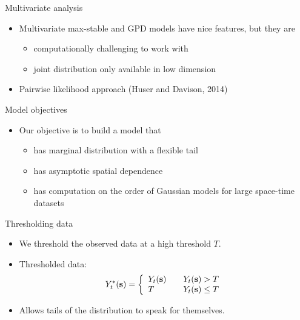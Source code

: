 \documentclass{beamer}
\begin{document}
\begin{frame}{Multivariate analysis}
  \begin{itemize} \setlength{\itemsep}{0.5em}
    \item Multivariate max-stable and GPD models have nice features, but they are
    \begin{itemize}
      \item computationally challenging to work with
      \item joint distribution only available in low dimension
    \end{itemize}
    \item Pairwise likelihood approach (Huser and Davison, 2014)
  \end{itemize}
\end{frame}

\begin{frame}{Model objectives}
  \begin{itemize} \setlength{\itemsep}{0.5em}
    \item Our objective is to build a model that
    \begin{itemize}
      \item has marginal distribution with a flexible tail
      \item has asymptotic spatial dependence
      \item has computation on the order of Gaussian models for large space-time datasets
    \end{itemize}
  \end{itemize}
\end{frame}

\begin{frame}{Thresholding data}
  \begin{itemize} \setlength{\itemsep}{0.5em}
    \item We threshold the observed data at a high threshold $T$.
    \item Thresholded data:
    \begin{align*}
      Y_t^*(\mbox{\bf s}) = \left\{ \begin{array}{ll}
          Y_t(\mbox{\bf s}) \quad & Y_t(\mbox{\bf s}) > T\\
          T \quad & Y_t(\mbox{\bf s}) \le T
      \end{array}\right.
    \end{align*}
    \item Allows tails of the distribution to speak for themselves.
  \end{itemize}
\end{frame}
\end{document}
